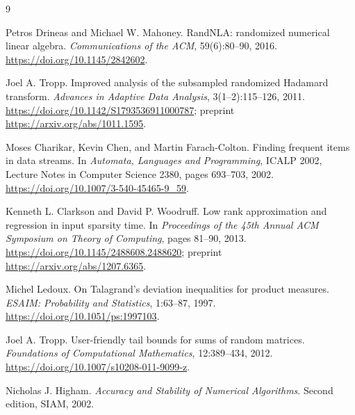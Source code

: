 \documentclass[11pt]{article}
\theoremstyle{remark}
\begin{document}
\begin{thebibliography}{9}

Petros Drineas and Michael W. Mahoney.
\newblock RandNLA: randomized numerical linear algebra.
\newblock \emph{Communications of the ACM}, 59(6):80--90, 2016.
\newblock \url{https://doi.org/10.1145/2842602}.

Joel A. Tropp.
\newblock Improved analysis of the subsampled randomized Hadamard transform.
\newblock \emph{Advances in Adaptive Data Analysis}, 3(1--2):115--126, 2011.
\newblock \url{https://doi.org/10.1142/S1793536911000787};
preprint \url{https://arxiv.org/abs/1011.1595}.

Moses Charikar, Kevin Chen, and Martin Farach-Colton.
\newblock Finding frequent items in data streams.
\newblock In \emph{Automata, Languages and Programming}, ICALP 2002,
Lecture Notes in Computer Science 2380, pages 693--703, 2002.
\newblock \url{https://doi.org/10.1007/3-540-45465-9_59}.

Kenneth L. Clarkson and David P. Woodruff.
\newblock Low rank approximation and regression in input sparsity time.
\newblock In \emph{Proceedings of the 45th Annual ACM Symposium on Theory of
Computing}, pages 81--90, 2013.
\newblock \url{https://doi.org/10.1145/2488608.2488620};
preprint \url{https://arxiv.org/abs/1207.6365}.

Michel Ledoux.
\newblock On Talagrand's deviation inequalities for product measures.
\newblock \emph{ESAIM: Probability and Statistics}, 1:63--87, 1997.
\newblock \url{https://doi.org/10.1051/ps:1997103}.

Joel A. Tropp.
\newblock User-friendly tail bounds for sums of random matrices.
\newblock \emph{Foundations of Computational Mathematics}, 12:389--434, 2012.
\newblock \url{https://doi.org/10.1007/s10208-011-9099-z}.

Nicholas J. Higham.
\newblock \emph{Accuracy and Stability of Numerical Algorithms}.
\newblock Second edition, SIAM, 2002.

\end{thebibliography}
\end{document}
